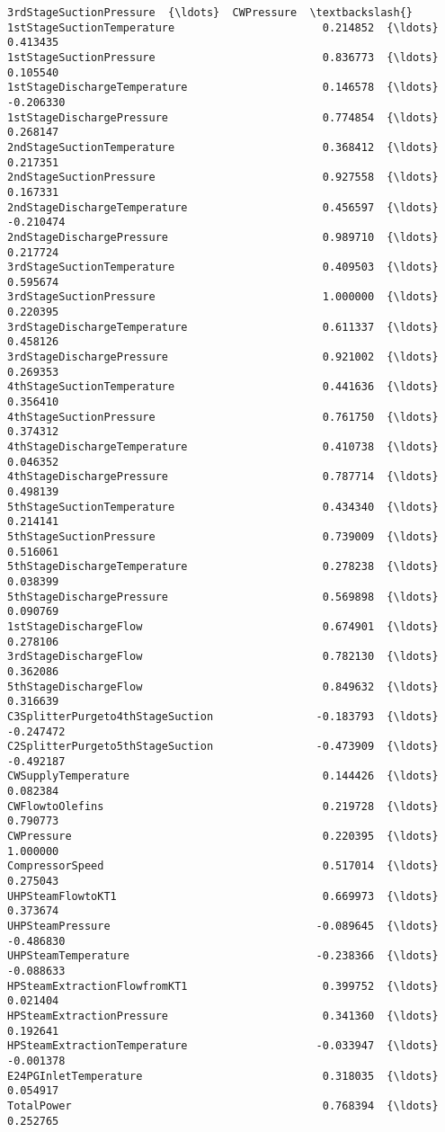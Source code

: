 \documentclass[11pt]{article}
\begin{document}
\begin{tcolorbox}[breakable, size=fbox, boxrule=.5pt, pad at break*=1mm, opacityfill=0]
\begin{Verbatim}[commandchars=\\\{\}]
                                  3rdStageSuctionPressure  {\ldots}  CWPressure  \textbackslash{}
1stStageSuctionTemperature                       0.214852  {\ldots}    0.413435
1stStageSuctionPressure                          0.836773  {\ldots}    0.105540
1stStageDischargeTemperature                     0.146578  {\ldots}   -0.206330
1stStageDischargePressure                        0.774854  {\ldots}    0.268147
2ndStageSuctionTemperature                       0.368412  {\ldots}    0.217351
2ndStageSuctionPressure                          0.927558  {\ldots}    0.167331
2ndStageDischargeTemperature                     0.456597  {\ldots}   -0.210474
2ndStageDischargePressure                        0.989710  {\ldots}    0.217724
3rdStageSuctionTemperature                       0.409503  {\ldots}    0.595674
3rdStageSuctionPressure                          1.000000  {\ldots}    0.220395
3rdStageDischargeTemperature                     0.611337  {\ldots}    0.458126
3rdStageDischargePressure                        0.921002  {\ldots}    0.269353
4thStageSuctionTemperature                       0.441636  {\ldots}    0.356410
4thStageSuctionPressure                          0.761750  {\ldots}    0.374312
4thStageDischargeTemperature                     0.410738  {\ldots}    0.046352
4thStageDischargePressure                        0.787714  {\ldots}    0.498139
5thStageSuctionTemperature                       0.434340  {\ldots}    0.214141
5thStageSuctionPressure                          0.739009  {\ldots}    0.516061
5thStageDischargeTemperature                     0.278238  {\ldots}    0.038399
5thStageDischargePressure                        0.569898  {\ldots}    0.090769
1stStageDischargeFlow                            0.674901  {\ldots}    0.278106
3rdStageDischargeFlow                            0.782130  {\ldots}    0.362086
5thStageDischargeFlow                            0.849632  {\ldots}    0.316639
C3SplitterPurgeto4thStageSuction                -0.183793  {\ldots}   -0.247472
C2SplitterPurgeto5thStageSuction                -0.473909  {\ldots}   -0.492187
CWSupplyTemperature                              0.144426  {\ldots}    0.082384
CWFlowtoOlefins                                  0.219728  {\ldots}    0.790773
CWPressure                                       0.220395  {\ldots}    1.000000
CompressorSpeed                                  0.517014  {\ldots}    0.275043
UHPSteamFlowtoKT1                                0.669973  {\ldots}    0.373674
UHPSteamPressure                                -0.089645  {\ldots}   -0.486830
UHPSteamTemperature                             -0.238366  {\ldots}   -0.088633
HPSteamExtractionFlowfromKT1                     0.399752  {\ldots}    0.021404
HPSteamExtractionPressure                        0.341360  {\ldots}    0.192641
HPSteamExtractionTemperature                    -0.033947  {\ldots}   -0.001378
E24PGInletTemperature                            0.318035  {\ldots}    0.054917
TotalPower                                       0.768394  {\ldots}    0.252765


\end{Verbatim}
\end{tcolorbox}
\end{document}

